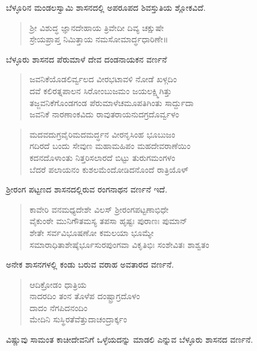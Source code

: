 ಬೆಳ್ಳೂರಿನ ಮಂಡಲಸ್ವಾಮಿ ಶಾಸನದಲ್ಲಿ ಅಪರೂಪದ ಶಿವಸ್ತುತಿಯ ಶ್ಲೋಕವಿದೆ.

\begin{verse}
ಶ‍್ರೀ ವಿಶುದ್ಧ ಜ್ಞಾನದೇಹಾಯ ತ್ರಿವೇದೀ ದಿವ್ಯ ಚಕ್ಷುಷೇ\\ ಸ್ರೇಯಪ್ರಾಪ್ತ ನಿಮಿತ್ತಾಯ ನಮಸೋಮಾರ್ದ್ಧಧಾರಿಣೇ॥
\end{verse}

ಬೆಳ್ಳೂರು ಶಾಸನದ ಪೆರುಮಾಳೆ ದೇವ ದಂಡನಾಯಕನ ವರ್ಣನೆ

\begin{verse}
ಜವನಿಕೆಯೊಡಲಿರ್ವ್ವಲದ ವೀರಭಟಾವಳಿ ನೋಡೆ ಖಳ್ಗದಿಂ\\ ದವೆ ಕಲಿರತ್ನಪಾಲನ ಸಿರೋಂಬುಜಮಂ ಜಯಲಕ್ಷ್ಮಿಗಿತ್ತು \\ ತಜ್ಜವನಿಕೆಗೊಂಡಗಂಡ ಪೆರುಮಾಳೆಚಮೂಪತಿಗಿಂತು ಸಾರ್ದ್ದುದಾ \\ ಜವನಿಕೆ ನಾರಣಾಂಕವಿದು ರಾವುತರಾಯನುದಗ್ರದೊರ್ವ್ವಳಂ
\end{verse}

\begin{verse}
ಮದವದುಗ್ರವೈರಿಮದಮರ್ದ್ಧನ ವೀರನೃಸಿಂಹ ಭೂಬುಜಂ \\ ಗದಿರದೆ ಬಂದು ಸೇವುಣ ಮಹಾಮಹಿಪಂ ಮಹದೇವರಾಣೆಯಿಂ \\ ಕದನದೊಳಾಂತು ನಿತ್ತರಿಸಲಾರದೆ ಬಿಟ್ಟು ತುರುಗಮಂಗಳಂ \\ ಬೆದರೆ ಪಲಾಯನಂ ಕುಶಲಮೆಂದೋಡಿದನೊಂದೆ ರಾತ್ರಿಯೊಳ್​
\end{verse}

ಶ‍್ರೀರಂಗ ಪಟ್ಟಣದ ಶಾಸನದಲ್ಲಿರುವ ರಂಗನಾಥನ ವರ್ಣನೆ ಇದೆ.

\begin{verse}
ಕಾವೇರಿ ವನಮಧ್ಯದೇಶೇ ವಿಲಸ್​ ಶ‍್ರೀರಂಗಪಟ್ಟಣಾಭಿಧೇ \\ ವೈಕುಂಠೇ ಮುನಿಗೌತಮಸ್ಯ ತಪಸಾ ಹೃಷ್ಟಃ ಪುರಾಣಃ ಪುಮಾನ್​ \\ ಶೇತೇ ಸರ್ವವಿಭೂಷಣೋ ಕಮಲಯಾ ಭೂಮ್ಯೇ \\ ಸಮಾರಾಧಿತಾಶೇಷೈರ್ಭೂಸುರಪುಂಗವಾ ವಿಕೃತಿಭಿಃ ಸಂಶೇವಿತಃ ಶಾಶ್ವತಂ
\end{verse}

ಅನೇಕ ಶಾಸನಗಳಲ್ಲಿ ಕಂಡು ಬರುವ ವರಾಹ ಅವತಾರದ ವರ್ಣನೆ.

\begin{verse}
ಆದಿಕ್ರೋಡಂ ಧಾತ್ರಿಯ \\ ನಾದರದಿಂ ತಂನ ತೊಳೆಪ ದಂಷ್ಟ್ರಾಗ್ರದೊಳಂ \\ ದಾದಂ ನೆಗಪಿದನಂದಿಂ \\ ಮೇದಿನಿ ಸುಸ್ಥಿರತೆವೆತ್ತುದಾಚಂದ್ರಾರ್ಕ್ಕಂ
\end{verse}

ವಿಷ್ಣುವು ಸಾಮಂತ ಕಾಚೀದೇವನಿಗೆ ಒಳ್ಳೆಯದನ್ನು ಮಾಡಲಿ ಎನ್ನುವ ಬೆಳ್ಳೂರು ಶಾಸನದ ವರ್ಣನೆ.

